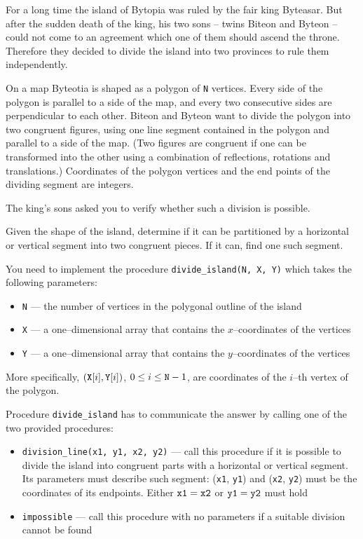 \documentclass{boi2014}
\newcommand{\param}[1]{{\tt #1}}
\newcommand{\method}[1]{{\tt #1}}
\newcommand{\N}{\param{N}}
\newcommand{\X}{\param{X}}
\newcommand{\Y}{\param{Y}}
\newcommand{\xa}{\param{x1}}
\newcommand{\ya}{\param{y1}}
\newcommand{\xb}{\param{x2}}
\newcommand{\yb}{\param{y2}}
\begin{document}
    For a long time the island of Bytopia was ruled by the fair king
    Byteasar. But after the sudden death
    of the king, his two sons -- twins Biteon and Byteon -- could
    not come to an agreement which one of them should ascend the throne.
    Therefore they decided to divide the island into two provinces to
    rule them independently.  
 
    On a map Byteotia is shaped as a polygon of \N{} vertices. Every
    side of the polygon is parallel to a side of the map, and every
    two consecutive sides are perpendicular to each other.  Biteon
    and Byteon want to divide the polygon into two congruent figures,
    using one line segment contained in the polygon and parallel to a
    side of the map.  (Two figures are congruent if one can be transformed
    into the other using a combination of reflections, rotations and
    translations.) Coordinates of the polygon vertices and the end points
    of the dividing segment are integers.  
 
    The king's sons asked you to verify whether such a division is
    possible.

    \Task

    Given the shape of the island, determine if it can be partitioned
    by a horizontal or vertical segment into two congruent pieces. If
    it can, find one such segment.

    \Implementation
    You need to implement the procedure \method{divide\_island(N, X, Y)}
    which takes the following parameters:
    \begin{itemize}
        \item \N{} --- the number of vertices in the polygonal outline of
            the island
        \item \X{} --- a one--dimensional array that contains the
            $x$--coordinates of the vertices
        \item \Y{} --- a one--dimensional array that contains the
            $y$--coordinates of the vertices
    \end{itemize}

    More specifically, $(\X[i], \Y[i])$, $0 \le i \le \N-1$, are
    coordinates of the $i$--th vertex of the polygon.

    Procedure \method{divide\_island} has to communicate the answer
    by calling one of the two provided procedures:
    \begin{itemize}
        \item \method{division\_line(\xa, \ya, \xb, \yb)} --- call
            this procedure if it is possible to divide the island
            into congruent parts with a horizontal or vertical segment.
            Its parameters must describe such segment: 
            (\xa, \ya) and (\xb, \yb) must be the coordinates of its
            endpoints. Either $\xa = \xb$ or $\ya = \yb$ must hold
        \item \method{impossible} --- call this procedure with no
            parameters if a suitable division cannot be found
    \end{itemize}
\end{document}
